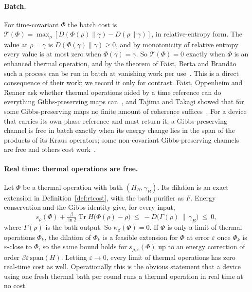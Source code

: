 \documentclass[11pt]{article}
\theoremstyle{definition}
\theoremstyle{remark}
\newcommand{\Tr}{\operatorname{Tr}}
\newcommand{\Tcap}{\mathcal T}
\newcommand{\Trt}{\kappa_\beta}
\begin{document}
\paragraph{Batch.} For time-covariant $\Phi$ the batch cost is $\Tcap(\Phi)=\max_\rho[D(\Phi(\rho)\|\gamma)-D(\rho\|\gamma)]$, in relative-entropy form. The value at $\rho=\gamma$ is $D(\Phi(\gamma)\|\gamma)\ge0$, and by monotonicity of relative entropy every value is at most zero when $\Phi(\gamma)=\gamma$. So $\Tcap(\Phi)=0$ exactly when $\Phi$ is an enhanced thermal operation, and by the theorem of Faist, Berta and Brand\~ao such a process can be run in batch at vanishing work per use~\cite{FBB21}. This is a direct consequence of their work; we record it only for contrast. Faist, Oppenheim and Renner ask whether thermal operations aided by a time reference can do everything Gibbs-preserving maps can~\cite{FOR15}, and Tajima and Takagi showed that for some Gibbs-preserving maps no finite amount of coherence suffices~\cite{TajimaTakagi25}. For a device that carries its own phase reference and must return it, a Gibbs-preserving channel is free in batch exactly when its energy change lies in the span of the products of its Kraus operators; some non-covariant Gibbs-preserving channels are free and others cost work~\cite{KeepingTime}.

\paragraph{Real time: thermal operations are free.} Let $\Phi$ be a thermal operation with bath $(H_B,\gamma_B)$. Its dilation is an exact extension in Definition~\ref{def:rtcost}, with the bath purifier as $F$. Energy conservation and the Gibbs identity give, for every input,
\[
s_\rho(\Phi)+\tfrac{\beta}{\ln2}\Tr H\bigl(\Phi(\rho)-\rho\bigr)\ \le\ -D\bigl(\Gamma(\rho)\,\big\|\,\gamma_B\bigr)\ \le\ 0,
\]
where $\Gamma(\rho)$ is the bath output. So $\Trt(\Phi)=0$. If $\Phi$ is only a limit of thermal operations $\Phi_k$, the dilation of $\Phi_k$ is a feasible extension for $\Phi$ at error $\varepsilon$ once $\Phi_k$ is $\varepsilon$-close to $\Phi$, so the same bound holds for $s_{\rho,\varepsilon}(\Phi)$ up to an energy correction of order $\beta\varepsilon\,\mathrm{span}(H)$. Letting $\varepsilon\to0$, every limit of thermal operations has zero real-time cost as well. Operationally this is the obvious statement that a device using one fresh thermal bath per round runs a thermal operation in real time at no cost.
\end{document}

